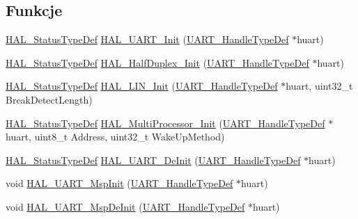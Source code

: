 \subsection*{Funkcje}
\begin{DoxyCompactItemize}
\item 
\hyperlink{stm32f4xx__hal__def_8h_a63c0679d1cb8b8c684fbb0632743478f}{H\+A\+L\+\_\+\+Status\+Type\+Def} \hyperlink{group___u_a_r_t___exported___functions___group1_gabe47045024787099b0bfa82bbe7b0b6a}{H\+A\+L\+\_\+\+U\+A\+R\+T\+\_\+\+Init} (\hyperlink{group___u_a_r_t___exported___types_ga7adf4f3e4c3ecde572be5925c915a967}{U\+A\+R\+T\+\_\+\+Handle\+Type\+Def} $\ast$huart)
\item 
\hyperlink{stm32f4xx__hal__def_8h_a63c0679d1cb8b8c684fbb0632743478f}{H\+A\+L\+\_\+\+Status\+Type\+Def} \hyperlink{group___u_a_r_t___exported___functions___group1_ga927245827265eff1f3580a0121efd424}{H\+A\+L\+\_\+\+Half\+Duplex\+\_\+\+Init} (\hyperlink{group___u_a_r_t___exported___types_ga7adf4f3e4c3ecde572be5925c915a967}{U\+A\+R\+T\+\_\+\+Handle\+Type\+Def} $\ast$huart)
\item 
\hyperlink{stm32f4xx__hal__def_8h_a63c0679d1cb8b8c684fbb0632743478f}{H\+A\+L\+\_\+\+Status\+Type\+Def} \hyperlink{group___u_a_r_t___exported___functions___group1_ga27e4497270bd06434e3965e4b06f5516}{H\+A\+L\+\_\+\+L\+I\+N\+\_\+\+Init} (\hyperlink{group___u_a_r_t___exported___types_ga7adf4f3e4c3ecde572be5925c915a967}{U\+A\+R\+T\+\_\+\+Handle\+Type\+Def} $\ast$huart, uint32\+\_\+t Break\+Detect\+Length)
\item 
\hyperlink{stm32f4xx__hal__def_8h_a63c0679d1cb8b8c684fbb0632743478f}{H\+A\+L\+\_\+\+Status\+Type\+Def} \hyperlink{group___u_a_r_t___exported___functions___group1_gaae1b49f0cb62235141807d8cbc61bc4d}{H\+A\+L\+\_\+\+Multi\+Processor\+\_\+\+Init} (\hyperlink{group___u_a_r_t___exported___types_ga7adf4f3e4c3ecde572be5925c915a967}{U\+A\+R\+T\+\_\+\+Handle\+Type\+Def} $\ast$huart, uint8\+\_\+t Address, uint32\+\_\+t Wake\+Up\+Method)
\item 
\hyperlink{stm32f4xx__hal__def_8h_a63c0679d1cb8b8c684fbb0632743478f}{H\+A\+L\+\_\+\+Status\+Type\+Def} \hyperlink{group___u_a_r_t___exported___functions___group1_ga8d98eaab25e61ae12e2e240c3388c57b}{H\+A\+L\+\_\+\+U\+A\+R\+T\+\_\+\+De\+Init} (\hyperlink{group___u_a_r_t___exported___types_ga7adf4f3e4c3ecde572be5925c915a967}{U\+A\+R\+T\+\_\+\+Handle\+Type\+Def} $\ast$huart)
\item 
void \hyperlink{group___u_a_r_t___exported___functions___group1_ga0e553b32211877322f949b14801bbfa7}{H\+A\+L\+\_\+\+U\+A\+R\+T\+\_\+\+Msp\+Init} (\hyperlink{group___u_a_r_t___exported___types_ga7adf4f3e4c3ecde572be5925c915a967}{U\+A\+R\+T\+\_\+\+Handle\+Type\+Def} $\ast$huart)
\item 
void \hyperlink{group___u_a_r_t___exported___functions___group1_ga718f39804e3b910d738a0e1e46151188}{H\+A\+L\+\_\+\+U\+A\+R\+T\+\_\+\+Msp\+De\+Init} (\hyperlink{group___u_a_r_t___exported___types_ga7adf4f3e4c3ecde572be5925c915a967}{U\+A\+R\+T\+\_\+\+Handle\+Type\+Def} $\ast$huart)
\end{DoxyCompactItemize}


